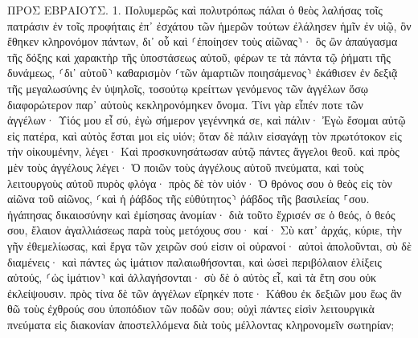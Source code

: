 \documentclass[twoside, 9pt]{extreport}
\begin{document}
ΠΡΟΣ ΕΒΡΑΙΟΥΣ.
1.
Πολυμερῶς καὶ πολυτρόπως πάλαι ὁ θεὸς λαλήσας τοῖς πατράσιν ἐν τοῖς προφήταις 
ἐπ᾽ ἐσχάτου τῶν ἡμερῶν τούτων ἐλάλησεν ἡμῖν ἐν υἱῷ, ὃν ἔθηκεν κληρονόμον πάντων, δι᾽ οὗ καὶ ⸂ἐποίησεν τοὺς αἰῶνας⸃· 
ὃς ὢν ἀπαύγασμα τῆς δόξης καὶ χαρακτὴρ τῆς ὑποστάσεως αὐτοῦ, φέρων τε τὰ πάντα τῷ ῥήματι τῆς δυνάμεως, ⸂δι᾽ αὑτοῦ⸃ καθαρισμὸν ⸂τῶν ἁμαρτιῶν ποιησάμενος⸃ ἐκάθισεν ἐν δεξιᾷ τῆς μεγαλωσύνης ἐν ὑψηλοῖς, 
τοσούτῳ κρείττων γενόμενος τῶν ἀγγέλων ὅσῳ διαφορώτερον παρ᾽ αὐτοὺς κεκληρονόμηκεν ὄνομα. 
Τίνι γὰρ εἶπέν ποτε τῶν ἀγγέλων· Υἱός μου εἶ σύ, ἐγὼ σήμερον γεγέννηκά σε, καὶ πάλιν· Ἐγὼ ἔσομαι αὐτῷ εἰς πατέρα, καὶ αὐτὸς ἔσται μοι εἰς υἱόν; 
ὅταν δὲ πάλιν εἰσαγάγῃ τὸν πρωτότοκον εἰς τὴν οἰκουμένην, λέγει· Καὶ προσκυνησάτωσαν αὐτῷ πάντες ἄγγελοι θεοῦ. 
καὶ πρὸς μὲν τοὺς ἀγγέλους λέγει· Ὁ ποιῶν τοὺς ἀγγέλους αὐτοῦ πνεύματα, καὶ τοὺς λειτουργοὺς αὐτοῦ πυρὸς φλόγα· 
πρὸς δὲ τὸν υἱόν· Ὁ θρόνος σου ὁ θεὸς εἰς τὸν αἰῶνα τοῦ αἰῶνος, ⸂καὶ ἡ ῥάβδος τῆς εὐθύτητος⸃ ῥάβδος τῆς βασιλείας ⸀σου. 
ἠγάπησας δικαιοσύνην καὶ ἐμίσησας ἀνομίαν· διὰ τοῦτο ἔχρισέν σε ὁ θεός, ὁ θεός σου, ἔλαιον ἀγαλλιάσεως παρὰ τοὺς μετόχους σου· 
καί· Σὺ κατ᾽ ἀρχάς, κύριε, τὴν γῆν ἐθεμελίωσας, καὶ ἔργα τῶν χειρῶν σού εἰσιν οἱ οὐρανοί· 
αὐτοὶ ἀπολοῦνται, σὺ δὲ διαμένεις· καὶ πάντες ὡς ἱμάτιον παλαιωθήσονται, 
καὶ ὡσεὶ περιβόλαιον ἑλίξεις αὐτούς, ⸂ὡς ἱμάτιον⸃ καὶ ἀλλαγήσονται· σὺ δὲ ὁ αὐτὸς εἶ, καὶ τὰ ἔτη σου οὐκ ἐκλείψουσιν. 
πρὸς τίνα δὲ τῶν ἀγγέλων εἴρηκέν ποτε· Κάθου ἐκ δεξιῶν μου ἕως ἂν θῶ τοὺς ἐχθρούς σου ὑποπόδιον τῶν ποδῶν σου; 
οὐχὶ πάντες εἰσὶν λειτουργικὰ πνεύματα εἰς διακονίαν ἀποστελλόμενα διὰ τοὺς μέλλοντας κληρονομεῖν σωτηρίαν; 
\end{document}
